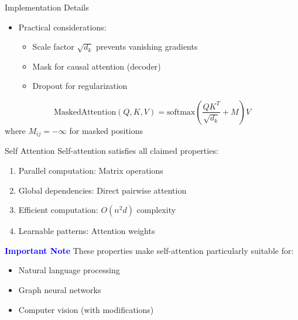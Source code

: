\documentclass[serif, aspectratio=169]{beamer}
\begin{document}
\begin{frame}{Implementation Details}
    \begin{itemize}
        \item Practical considerations:
        \begin{itemize}
            \item Scale factor $\sqrt{d_k}$ prevents vanishing gradients
            \item Mask for causal attention (decoder)
            \item Dropout for regularization
        \end{itemize}
    \end{itemize}
    \begin{equation*}
        \text{MaskedAttention}(Q, K, V) = \text{softmax}\left(\frac{QK^T}{\sqrt{d_k}} + M\right)V
    \end{equation*}
    where $M_{ij} = -\infty$ for masked positions
\end{frame}

\begin{frame}{Self Attention}
        Self-attention satisfies all claimed properties:
        \begin{enumerate}
            \item Parallel computation: Matrix operations
            \item Global dependencies: Direct pairwise attention
            \item Efficient computation: $O(n^2d)$ complexity
            \item Learnable patterns: Attention weights
        \end{enumerate}
    \textcolor{blue}{\textbf{Important Note}}
    \newline
        These properties make self-attention particularly suitable for:
        \begin{itemize}
            \item Natural language processing
            \item Graph neural networks
            \item Computer vision (with modifications)
        \end{itemize}
\end{frame}
\end{document}
